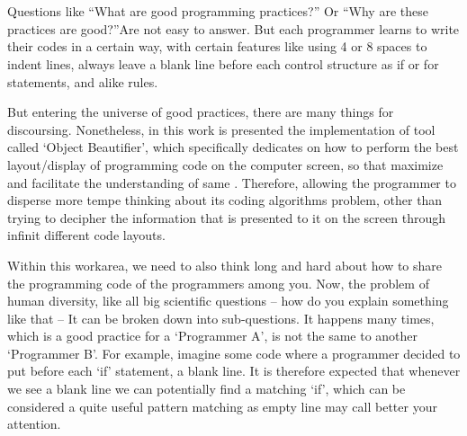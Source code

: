 

%


\chapter{}


\begin{englishtext}

    Questions like ``What are good programming practices?'' Or ``Why are these
    practices are good?''Are not easy to answer. But each programmer learns to
    write their codes in a certain way, with certain features like using 4 or 8
    spaces to indent lines, always leave a blank line before each control
    structure as if or for statements, and alike rules.
    \cite{naturalCodingConventions}

    But entering the universe of good practices, there are many things for
    discoursing. Nonetheless, in this work is presented the implementation of
    tool called `Object Beautifier', which specifically dedicates on how to
    perform the best layout/display of programming code on the computer screen,
    so that maximize and facilitate the understanding of same
    \cite{automaticSynthesis}. Therefore, allowing the programmer to disperse
    more tempe thinking about its coding algorithms problem, other than trying
    to decipher the information that is presented to it on the screen through
    infinit different code layouts.

    Within this work\s area, we need to also think long and hard about how to
    share the programming code of the programmers among you. Now, the problem of
    human diversity, like all big scientific questions -- how do you explain
    something like that -- It can be broken down into sub-questions. It happens
    many times, which is a good practice for a `Programmer A', is not the same
    to another `Programmer B'. For example, imagine some code where a programmer
    decided to put before each `if' statement, a blank line. It is therefore
    expected that whenever we see a blank line we can potentially find a
    matching `if', which can be considered a quite useful pattern matching as
    empty line may call better your attention. \cite{aPrettyGoodFormatting}


\end{englishtext}
